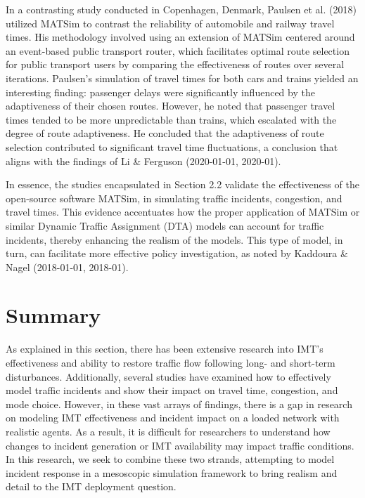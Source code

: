 \documentclass[fancy, oneside, mastersfancy, ms]{byuthesis}
\begin{document}
In a contrasting study conducted in Copenhagen, Denmark, Paulsen et al.
(2018) utilized MATSim to contrast the reliability of automobile and
railway travel times. His methodology involved using an extension of
MATSim centered around an event-based public transport router, which
facilitates optimal route selection for public transport users by
comparing the effectiveness of routes over several iterations. Paulsen's
simulation of travel times for both cars and trains yielded an
interesting finding: passenger delays were significantly influenced by
the adaptiveness of their chosen routes. However, he noted that
passenger travel times tended to be more unpredictable than trains,
which escalated with the degree of route adaptiveness. He concluded that
the adaptiveness of route selection contributed to significant travel
time fluctuations, a conclusion that aligns with the findings of Li \&
Ferguson (2020-01-01, 2020-01).

In essence, the studies encapsulated in Section 2.2 validate the
effectiveness of the open-source software MATSim, in simulating traffic
incidents, congestion, and travel times. This evidence accentuates how
the proper application of MATSim or similar Dynamic Traffic Assignment
(DTA) models can account for traffic incidents, thereby enhancing the
realism of the models. This type of model, in turn, can facilitate more
effective policy investigation, as noted by Kaddoura \& Nagel
(2018-01-01, 2018-01).

\hypertarget{summary}{%
\section{Summary}\label{summary}}

As explained in this section, there has been extensive research into
IMT's effectiveness and ability to restore traffic flow following long-
and short-term disturbances. Additionally, several studies have examined
how to effectively model traffic incidents and show their impact on
travel time, congestion, and mode choice. However, in these vast arrays
of findings, there is a gap in research on modeling IMT effectiveness
and incident impact on a loaded network with realistic agents. As a
result, it is difficult for researchers to understand how changes to
incident generation or IMT availability may impact traffic conditions.
In this research, we seek to combine these two strands, attempting to
model incident response in a mesoscopic simulation framework to bring
realism and detail to the IMT deployment question.
\end{document}
